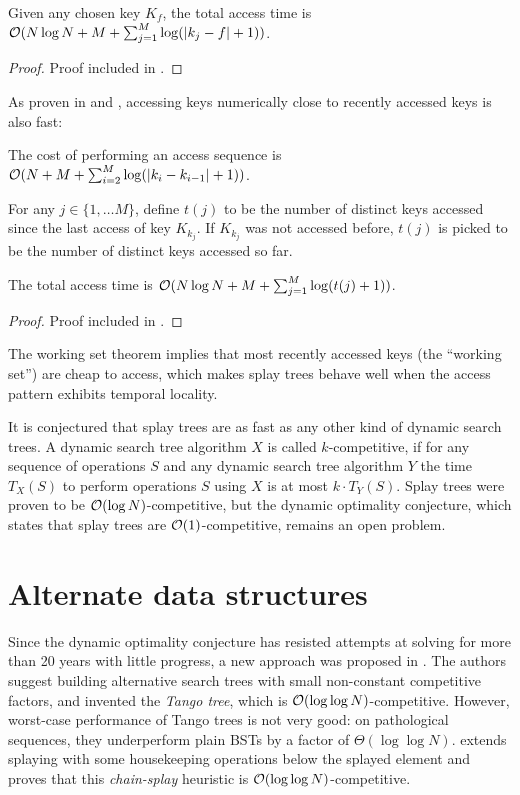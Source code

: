 \begin{theorem}
Given any chosen key $K_f$, the total access time is
$\mathcal{O}(N\log N + M + \sum_{j=1}^M \log(|k_j-f|+1))$.
\end{theorem}
\begin{proof}
	Proof included in \cite{splay}.
\end{proof}

As proven in \cite{dynamic-finger-1} and \cite{dynamic-finger-2},
accessing keys numerically close to recently accessed keys is also fast:
\begin{theorem}
The cost of performing an access sequence is
$\mathcal{O}(N+M+\sum_{i=2}^M \log(|k_i-k_{i-1}| + 1))$.
\end{theorem}

For any $j\in\{1,\ldots M\}$, define $t(j)$ to be the number of distinct
keys accessed since the last access of key $K_{k_j}$. If $K_{k_j}$ was not
accessed before, $t(j)$ is picked to be the number of distinct keys accessed
so far.
\begin{theorem}
The total access time is $\mathcal{O}(N\log N + M + \sum_{j=1}^M\log(t(j)+1))$.
\end{theorem}
\begin{proof}
	Proof included in \cite{splay}.
\end{proof}

The working set theorem implies that most recently accessed keys (the
``working set'') are cheap to access, which makes splay trees behave well when
the access pattern exhibits temporal locality.

It is conjectured that splay trees are as fast as any other kind of dynamic
search trees. A dynamic search tree algorithm $X$ is called $k$-competitive,
if for any sequence of operations $S$ and any dynamic search tree algorithm
$Y$ the time $T_X(S)$ to perform operations $S$ using $X$ is at most $k\cdot
T_Y(S)$. Splay trees were proven to be $\mathcal{O}(\log N)$-competitive, but
the dynamic optimality conjecture, which states that splay trees are
$\mathcal{O}(1)$-competitive, remains an open problem.

\section{Alternate data structures}
Since the dynamic optimality conjecture has resisted attempts at solving
for more than 20 years with little progress, a new approach was proposed in
\cite{tango}. The authors suggest building alternative search trees with small
non-constant competitive factors, and invented the \emph{Tango tree}, which
is $\mathcal{O}(\log\log N)$-competitive. However, worst-case performance of Tango trees
is not very good: on pathological sequences, they underperform plain BSTs
by a factor of $\Theta(\log\log N)$.
\cite{chain-splaying} extends splaying with some housekeeping operations
below the splayed element and proves that this \emph{chain-splay} heuristic
is $\mathcal{O}(\log\log N)$-competitive.

